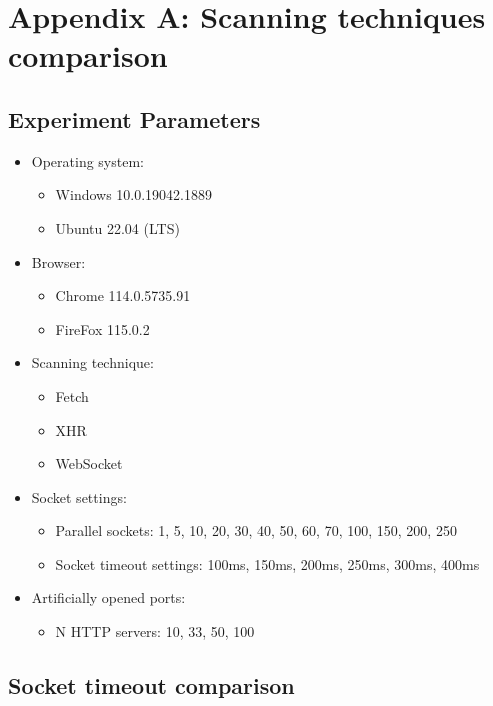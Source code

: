 \chapter{Appendix A: Scanning techniques comparison}
\label{appendix:appendix-a}

\section{Experiment Parameters}
\label{appendix:expirement-parameters}
\begin{itemize}
\item Operating system:
    \begin{itemize}
    \item Windows 10.0.19042.1889
    \item Ubuntu 22.04 (LTS)
    \end{itemize}
\item Browser:
    \begin{itemize}
    \item Chrome 114.0.5735.91
    \item FireFox 115.0.2
    \end{itemize}
\item Scanning technique:
    \begin{itemize}
    \item Fetch
    \item XHR
    \item WebSocket
    \end{itemize}
\item Socket settings:
    \begin{itemize}
    \item Parallel sockets: 1, 5, 10, 20, 30, 40, 50, 60, 70, 100, 150, 200, 250
    \item Socket timeout settings: 100ms, 150ms, 200ms, 250ms, 300ms, 400ms 
    \end{itemize}
\item Artificially opened ports:
    \begin{itemize}
    \item N HTTP servers: 10, 33, 50, 100
    \end{itemize}
\end{itemize}

\section{Socket timeout comparison}

